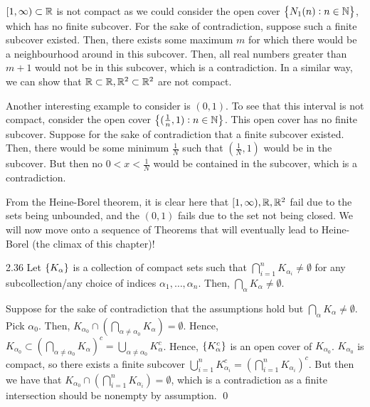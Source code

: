 $[1, \infty) \subset \mathbb{R}$ is not compact as we could consider the open cover $\set{N_1(n): n \in \mathbb{N}}$, which has no finite subcover. For the sake of contradiction, suppose such a finite subcover existed. Then, there exists some maximum $m$ for which there would be a neighbourhood around in this subcover. Then, all real numbers greater than $m+1$ would not be in this subcover, which is a contradiction. In a similar way, we can show that $\mathbb{R} \subset \mathbb{R}, \mathbb{R}^2 \subset \mathbb{R}^2$ are not compact. 

Another interesting example to consider is $(0, 1)$. To see that this interval is not compact, consider the open cover $\set{(\frac{1}{n}, 1): n \in \mathbb{N}}$. This open cover has no finite subcover. Suppose for the sake of contradiction that a finite subcover existed. Then, there would be some minimum $\frac{1}{N}$ such that $(\frac{1}{N}, 1)$ would be in the subcover. But then no $0 < x < \frac{1}{N}$ would be contained in the subcover, which is a contradiction.

From the Heine-Borel theorem, it is clear here that $[1, \infty), \mathbb{R}, \mathbb{R}^2$ fail due to the sets being unbounded, and the $(0, 1)$ fails due to the set not being closed. We will now move onto a sequence of Theorems that will eventually lead to Heine-Borel (the climax of this chapter)!

\begin{theorem}{}{2.36}
    Let $\set{K_\alpha}$ is a collection of compact sets such that $\bigcap_{i=1}^n K_{\alpha_{i}} \neq \emptyset$ for any subcollection/any choice of indices $\alpha_1, \ldots, \alpha_n$. Then, $\bigcap_\alpha K_\alpha \neq \emptyset$.
\end{theorem}
\begin{nproof}
    Suppose for the sake of contradiction that the assumptions hold but $\bigcap_\alpha K_\alpha \neq \emptyset$. Pick $\alpha_0$. Then, $K_{\alpha_0} \cap (\bigcap_{\alpha \neq \alpha_0} K_\alpha) = \emptyset$. Hence, $K_{\alpha_0} \subset \left(\bigcap_{\alpha \neq \alpha_0} K_\alpha \right)^c = \bigcup_{\alpha \neq \alpha_0} K_\alpha^c$. Hence, $\set{K_\alpha^c}$ is an open cover of $K_{\alpha_0}$. $K_{\alpha_0}$ is compact, so there exists a finite subcover $\bigcup_{i=1}^n K_{\alpha_i}^c = \left(\bigcap_{i=1}^n K_{\alpha_i}\right)^c$. But then we have that $K_{\alpha_0} \cap \left(\bigcap_{i=1}^n K_{\alpha_i}\right) = \emptyset$, which is a contradiction as a finite intersection should be nonempty by assumption. \qed
\end{nproof}

